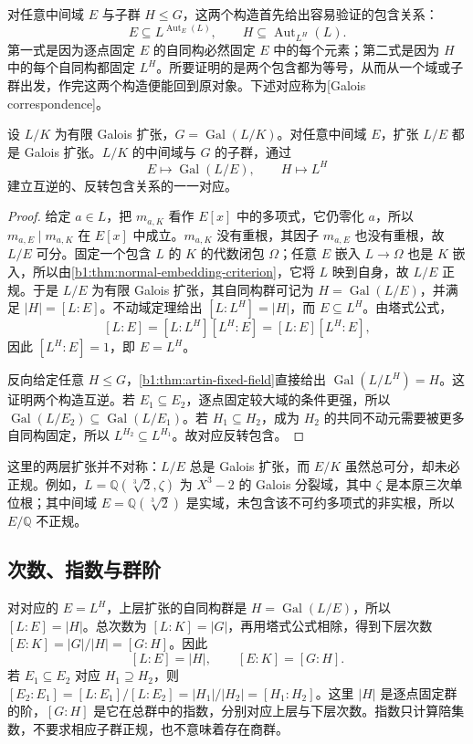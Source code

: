 对任意中间域 \(E\) 与子群 \(H\leq G\)，这两个构造首先给出容易验证的包含关系：
\[
	E\subseteq L^{\operatorname{Aut}_E(L)},\qquad H\subseteq\operatorname{Aut}_{L^H}(L).
\]
第一式是因为逐点固定 \(E\) 的自同构必然固定 \(E\) 中的每个元素；第二式是因为 \(H\) 中的每个自同构都固定 \(L^H\)。所要证明的是两个包含都为等号，从而从一个域或子群出发，作完这两个构造便能回到原对象。下述对应称为[Galois correspondence]。
\begin{theorem}\label{b1:thm:finite-galois-correspondence}
	设 \(L/K\) 为有限 Galois 扩张，\(G=\operatorname{Gal}(L/K)\)。对任意中间域 \(E\)，扩张 \(L/E\) 都是 Galois 扩张。\(L/K\) 的中间域与 \(G\) 的子群，通过
	\[
		E\longmapsto\operatorname{Gal}(L/E),\qquad H\longmapsto L^H
	\]
	建立互逆的、反转包含关系的一一对应。
\end{theorem}
\begin{proof}
	给定 \(a\in L\)，把 \(m_{a,K}\) 看作 \(E[x]\) 中的多项式，它仍零化 \(a\)，所以 \(m_{a,E}\mid m_{a,K}\) 在 \(E[x]\) 中成立。\(m_{a,K}\) 没有重根，其因子 \(m_{a,E}\) 也没有重根，故 \(L/E\) 可分。固定一个包含 \(L\) 的 \(K\) 的代数闭包 \(\Omega\)；任意 \(E\) 嵌入 \(L\rightarrow\Omega\) 也是 \(K\) 嵌入，所以由\cref{b1:thm:normal-embedding-criterion}，它将 \(L\) 映到自身，故 \(L/E\) 正规。于是 \(L/E\) 为有限 Galois 扩张，其自同构群可记为 \(H=\operatorname{Gal}(L/E)\)，并满足 \(|H|=[L:E]\)。不动域定理给出 \([L:L^H]=|H|\)，而 \(E\subseteq L^H\)。由塔式公式，
	\[
		[L:E]=[L:L^H][L^H:E]=[L:E][L^H:E],
	\]
	因此 \([L^H:E]=1\)，即 \(E=L^H\)。

	反向给定任意 \(H\leq G\)，\cref{b1:thm:artin-fixed-field}直接给出 \(\operatorname{Gal}(L/L^H)=H\)。这证明两个构造互逆。若 \(E_1\subseteq E_2\)，逐点固定较大域的条件更强，所以 \(\operatorname{Gal}(L/E_2)\subseteq\operatorname{Gal}(L/E_1)\)。若 \(H_1\subseteq H_2\)，成为 \(H_2\) 的共同不动元需要被更多自同构固定，所以 \(L^{H_2}\subseteq L^{H_1}\)。故对应反转包含。
\end{proof}
这里的两层扩张并不对称：\(L/E\) 总是 Galois 扩张，而 \(E/K\) 虽然总可分，却未必正规。例如，\(L=\mathbb Q(\sqrt[3]2,\zeta)\) 为 \(X^3-2\) 的 Galois 分裂域，其中 \(\zeta\) 是本原三次单位根；其中间域 \(E=\mathbb Q(\sqrt[3]2)\) 是实域，未包含该不可约多项式的非实根，所以 \(E/\mathbb Q\) 不正规。

\subsection{次数、指数与群阶}
\label{b1:subsec:1902:02}

对对应的 \(E=L^H\)，上层扩张的自同构群是 \(H=\operatorname{Gal}(L/E)\)，所以 \([L:E]=|H|\)。总次数为 \([L:K]=|G|\)，再用塔式公式相除，得到下层次数 \([E:K]=|G|/|H|=[G:H]\)。因此
\begin{equation}\label{b1:eq:galois-degree-index}
	[L:E]=|H|,\qquad [E:K]=[G:H].
\end{equation}
若 \(E_1\subseteq E_2\) 对应 \(H_1\supseteq H_2\)，则 \([E_2:E_1]=[L:E_1]/[L:E_2]=|H_1|/|H_2|=[H_1:H_2]\)。这里 \(|H|\) 是逐点固定群的阶，\([G:H]\) 是它在总群中的指数，分别对应上层与下层次数。指数只计算陪集数，不要求相应子群正规，也不意味着存在商群。

